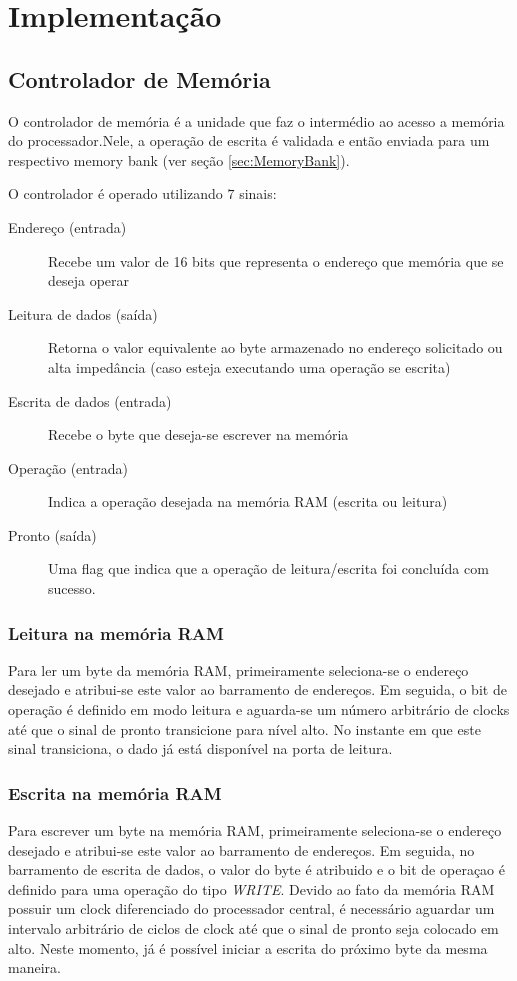 \documentclass[11pt]{report}
\begin{document}
\chapter{Implementação}

\section{Controlador de Memória}
\label{sec:MemoryController}
O controlador de memória é a unidade que faz o intermédio ao acesso a memória do processador.Nele, a operação de escrita é validada e então enviada para um respectivo memory bank (ver seção \ref{sec:MemoryBank}).

O controlador é operado utilizando $7$ sinais:

\begin{description}
	\item[Endereço (entrada)] Recebe um valor de 16 bits que representa o endereço que memória que se deseja operar
	\item[Leitura de dados (saída)] Retorna o valor equivalente ao byte armazenado no endereço solicitado ou alta impedância (caso esteja executando uma operação se escrita)
	\item[Escrita de dados (entrada)] Recebe o byte que deseja-se escrever na memória
	\item[Operação (entrada)] Indica a operação desejada na memória RAM (escrita ou leitura)
	\item[Pronto (saída)] Uma flag que indica que a operação de leitura/escrita foi concluída com sucesso.
\end{description}

\subsection{Leitura na memória RAM}
Para ler um byte da memória RAM, primeiramente seleciona-se o endereço desejado e atribui-se este valor ao barramento de endereços. Em seguida, o bit de operação é definido em modo leitura e aguarda-se um número arbitrário de clocks até que o sinal de pronto transicione para nível alto. No instante em que este sinal transiciona, o dado já está disponível na porta de leitura.

\subsection{Escrita na memória RAM}
Para escrever um byte na memória RAM, primeiramente seleciona-se o endereço desejado e atribui-se este valor ao barramento de endereços. Em seguida, no barramento de escrita de dados, o valor do byte é atribuido e o bit de operaçao é definido para uma operação do tipo \emph{WRITE}. Devido ao fato da memória RAM possuir um clock diferenciado do processador central, é necessário aguardar um intervalo arbitrário de ciclos de clock até que o sinal de pronto seja colocado em alto. Neste momento, já é possível iniciar a escrita do próximo byte da mesma maneira.
\end{document}
